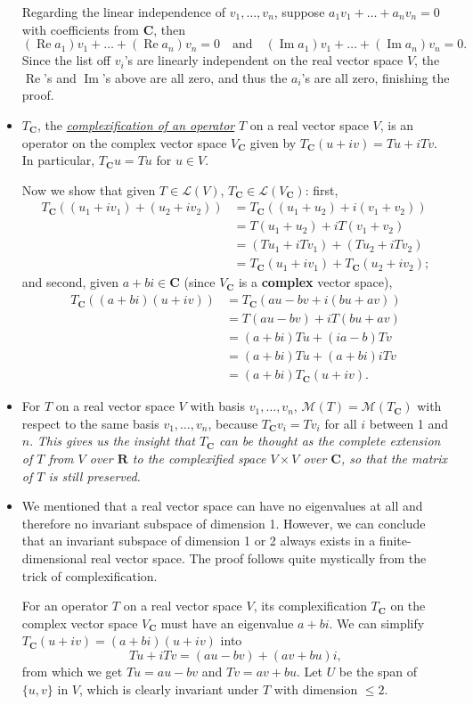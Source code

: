 \documentclass[11pt]{article}
\newcommand{\df}[1]{\ul{\textit{\textsf{#1}}}}
\newcommand{\R}{\mathbf{R}}
\newcommand{\C}{\mathbf{C}}
\renewcommand{\Re}{\operatorname{Re}}
\renewcommand{\Im}{\operatorname{Im}}
\newcommand{\LV}{\mathcal{L}(V)}
\newcommand{\M}{\mathcal{M}}
\begin{document}
\begin{itemize}
    Regarding the linear independence of $v_1,\dots,v_n$, suppose $a_1v_1+\dots+a_nv_n = 0$ with coefficients from $\C$, then 
    \[(\Re a_1)v_1+ \dots + (\Re a_n)v_n = 0 \quad \text{and} \quad (\Im a_1)v_1 + \dots + (\Im a_n)v_n = 0.\]
    Since the list off $v_i$'s are linearly independent on the real vector space $V$, the $\Re$'s and $\Im$'s above are all zero, and thus the $a_i$'s are all zero, finishing the proof.
    \item $T_\C$, the \df{complexification of an operator} $T$ on a real vector space $V$, is an operator on the complex vector space $V_\C$ given by $T_\C (u+iv) = Tu + i Tv$. In particular, $T_\C u = Tu$ for $u \in V$.

    Now we show that given $T \in \LV$, $T_\C \in \mathcal{L}(V_\C)$: first, \begin{align*}
        T_\C((u_1+iv_1)+(u_2+iv_2)) & = T_\C((u_1+u_2)+i(v_1+v_2)) \\ & = T(u_1+u_2) + iT(v_1+v_2) \\ & = (Tu_1 + iTv_1) + (Tu_2 + iTv_2) \\ & = T_\C(u_1 + iv_1) + T_\C(u_2 + iv_2);
    \end{align*}
    and second, given $a+bi \in \C$ (since $V_\C$ is a \textbf{complex} vector space),
    \begin{align*}
        T_\C((a+bi)(u+iv)) & = T_\C(au-bv + i(bu+av)) \\ & = T(au-bv) + iT(bu+av) \\ & = (a+bi)Tu+(ia-b)Tv \\ & = (a+bi)Tu + (a+bi)iTv \\ & = (a+bi) T_\C(u+iv).
    \end{align*}
    \item For $T$ on a real vector space $V$ with basis $v_1,\dots,v_n$, $\M(T) = \M(T_\C)$ with respect to the same basis $v_1,\dots,v_n$, because $T_\C v_i = Tv_i$ for all $i$ between 1 and $n$. \emph{This gives us the insight that $T_\C$ can be thought as the complete extension of $T$ from $V$ over $\R$ to the complexified space $V \times V$ over $\C$, so that the matrix of $T$ is still preserved.}
    \item We mentioned that a real vector space can have no eigenvalues at all and therefore no invariant subspace of dimension 1. However, we can conclude that an invariant subspace of dimension 1 or 2 always exists in a finite-dimensional real vector space. The proof follows quite mystically from the trick of complexification.

    For an operator $T$ on a real vector space $V$, its complexification $T_\C$ on the complex vector space $V_\C$ must have an eigenvalue $a+bi$. We can simplify $T_\C(u+iv) = (a+bi)(u+iv)$ into \[Tu+iTv = (au-bv)+(av+bu)i,\] from which we get $Tu = au-bv$ and $Tv = av+bu$. Let $U$ be the span of $\{u,v\}$ in $V$, which is clearly invariant under $T$ with dimension $\leq 2$.
    

\end{itemize}
\end{document}
